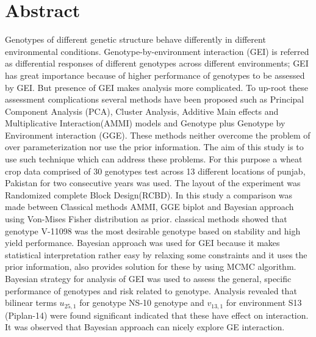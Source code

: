 
\chapter*{Abstract}
\noindent
Genotypes of different genetic structure behave differently in different environmental conditions. 
Genotype-by-environment interaction (GEI) is referred as differential responses of different genotypes across different environments; GEI has great importance because of higher performance of genotypes to be assessed by GEI. But presence of GEI makes analysis more complicated. To up-root these assessment complications several methods have been proposed such as Principal Component Analysis (PCA), Cluster Analysis, Additive Main effects and Multiplicative Interaction(AMMI) models  and Genotype plus Genotype by Environment interaction (GGE). These methods neither overcome the problem of over parameterization nor use the prior information. The aim of this study is to use such technique which can address these problems. For this purpose a wheat crop data comprised of 30 genotypes test across 13 different locations of punjab, Pakistan for two consecutive years was used. The layout of the experiment was Randomized complete Block Design(RCBD). In this study a comparison was made between Classical methods AMMI, GGE biplot and Bayesian approach using Von-Mises Fisher distribution as prior. classical methods showed that genotype V-11098 was the most desirable genotype based on stability and high yield performance. Bayesian approach was used for GEI because it makes statistical interpretation rather easy by relaxing some constraints and it uses the prior information, also provides solution for these by using MCMC algorithm. Bayesian strategy for analysis of GEI was used to assess the general, specific performance of genotypes and risk related to genotype. Analysis revealed that bilinear terms $u_{25,1}$ for genotype NS-10 genotype and $v_{13,1}$ for environment S13 (Piplan-14) were found significant indicated that these have effect on interaction. It was observed that Bayesian approach can nicely explore GE interaction.
